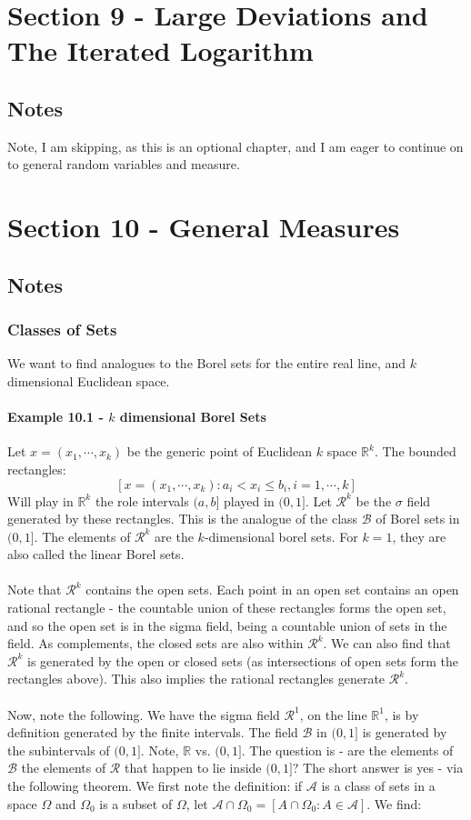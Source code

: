 \documentclass[12pt,a4paper]{article}
\newcommand{\1}[1]{\mathbbm{1}\left\{ #1 \right\}}
\newcommand{\R}{\mathbb{R}}
\newcommand{\acal}{\mathcal{A}}
\newcommand{\bcal}{\mathcal{B}}
\newcommand{\rcal}{\mathcal{R}}
\begin{document}
\section{Section 9 - Large Deviations and The Iterated Logarithm}
\subsection{Notes} Note, I am skipping, as this is an optional chapter, and I am eager to continue on to general random variables and measure.


\section{Section 10 - General Measures}
\subsection{Notes}
\subsubsection{Classes of Sets} We want to find analogues to the Borel sets for the entire real line, and $k$ dimensional Euclidean space. 

\paragraph{Example 10.1 - $k$ dimensional Borel Sets} Let $x = (x_1, \cdots ,x_k)$ be the generic point of Euclidean $k$ space $\R^k$. The bounded rectangles:
$$
	\left[x = (x_1, \cdots, x_k) : a_i < x_i \leq b_i, i = 1, \cdots, k\right]
$$
Will play in $\R^k$ the role intervals $(a,b]$ played in $(0,1]$. Let $\rcal^k$ be the $\sigma$ field generated by these rectangles. This is the analogue of the class $\bcal$ of Borel sets in $(0,1]$. The elements of $\rcal^k$ are the $k$-dimensional borel sets. For $k=1$, they are also called the linear Borel sets.
\\\\
Note that $\rcal^k$ contains the open sets. Each point in an open set contains an open rational rectangle - the countable union of these rectangles forms the open set, and so the open set is in the sigma field, being a countable union of sets in the field. As complements, the closed sets are also within $\rcal^k$. We can also find that $\rcal^k$ is generated by the open or closed sets (as intersections of open sets form the rectangles above). This also implies the rational rectangles generate $\rcal^k$. 
\\\\
Now, note the following. We have the sigma field $\rcal^1$, on the line $\R^1$, is by definition generated by the finite intervals. The field $\bcal$ in $(0,1]$ is generated by the subintervals of $(0,1]$. Note, $\R$ vs. $(0,1]$. The question is - are the elements of $\bcal$ the elements of $\rcal$ that happen to lie inside $(0,1]$? The short answer is yes - via the following theorem. We first note the definition: if $\acal$ is a class of sets in a space $\Omega$ and $\Omega_0$ is a subset of $\Omega$, let $\acal \cap \Omega_0 = \left[A \cap \Omega_0 : A \in \acal\right]$. We find:
\end{document}
